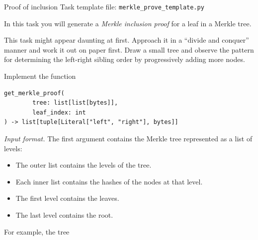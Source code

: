 \documentclass{homework}
\begin{document}
\begin{task}{Proof of inclusion}
  Task template file: \texttt{merkle\_prove\_template.py}

  In this task you will generate a \emph{Merkle inclusion proof} for a leaf in a Merkle tree.

  This task might appear daunting at first.
  Approach it in a \enquote{divide and conquer} manner and work it out on paper first.
  Draw a small tree and observe the pattern for determining the left-right sibling order by progressively adding more nodes.

  Implement the function
  \begin{Verbatim}
get_merkle_proof(
        tree: list[list[bytes]],
        leaf_index: int
) -> list[tuple[Literal["left", "right"], bytes]]
  \end{Verbatim}

  \textit{Input format.}
  The first argument contains the Merkle tree represented as a list of levels:
  \begin{itemize}
    \item The outer list contains the levels of the tree.
    \item Each inner list contains the hashes of the nodes at that level.
    \item The first level contains the leaves.
    \item The last level contains the root.
  \end{itemize}

  For example, the tree
  \begin{figure}[h]
      \centering
  \end{figure}
  

\end{task}
\end{document}

